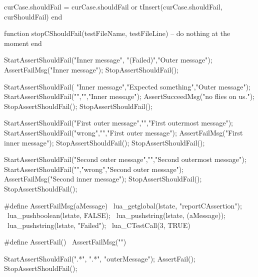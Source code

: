   curCase.shouldFail = curCase.shouldFail or { }
  tInsert(curCase.shouldFail, curShouldFail)
end

function stopCShouldFail(testFileName, testFileLine)
  -- do nothing at the moment
end
\stopLuaCode


\startCTest
StartAssertShouldFail("Inner message", "(Failed)","Outer message");
  AssertFailMsg("Inner message");
StopAssertShouldFail();
\stopCTest
\stopTestCase


\startCTest
StartAssertShouldFail(
  "Inner message","Expected something","Outer message");
  StartAssertShouldFail("","","Inner message");
    AssertSucceedMsg("no flies on us.");
  StopAssertShouldFail();
StopAssertShouldFail();
\stopCTest
\stopTestCase


\startCTest
StartAssertShouldFail("First outer message","","First outermost message");
StartAssertShouldFail("wrong","","First outer message");
  AssertFailMsg("First inner message");
StopAssertShouldFail();
StopAssertShouldFail();

StartAssertShouldFail("Second outer message","","Second outermost message");
StartAssertShouldFail("","wrong","Second outer message");
  AssertFailMsg("Second inner message");
StopAssertShouldFail();
StopAssertShouldFail();
\stopCTest
\stopTestCase

\stopTestSuite

\startTestSuite[assertFail]

\startCHeader
#define AssertFailMsg(aMessage)              \
  lua_getglobal(lstate, "reportCAssertion"); \
  lua_pushboolean(lstate, FALSE);            \
  lua_pushstring(lstate, (aMessage));        \
  lua_pushstring(lstate, "Failed");          \
  lua_CTestCall(3, TRUE)
  
#define AssertFail() \
  AssertFailMsg("")
\stopCHeader


\startCTest
  StartAssertShouldFail(".*", ".*", "outerMessage");
    AssertFail();
  StopAssertShouldFail();
\stopCTest

\stopTestCase

\stopTestSuite

\startTestSuite[assertSucceed]

